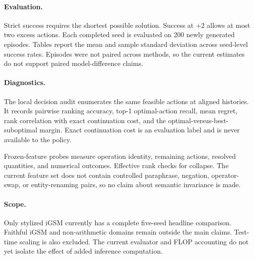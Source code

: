 \paragraph{Evaluation.}
Strict success requires the shortest possible solution. Success at $+2$ allows at most two excess actions. Each completed seed is evaluated on 200 newly generated episodes. Tables report the mean and sample standard deviation across seed-level success rates. Episodes were not paired across methods, so the current estimates do not support paired model-difference claims.

\paragraph{Diagnostics.}
The local decision audit enumerates the same feasible actions at aligned histories. It records pairwise ranking accuracy, top-1 optimal-action recall, mean regret, rank correlation with exact continuation cost, and the optimal-versus-best-suboptimal margin. Exact continuation cost is an evaluation label and is never available to the policy.

Frozen-feature probes measure operation identity, remaining actions, resolved quantities, and numerical outcomes. Effective rank checks for collapse. The current feature set does not contain controlled paraphrase, negation, operator-swap, or entity-renaming pairs, so no claim about semantic invariance is made.

\paragraph{Scope.}
Only stylized iGSM currently has a complete five-seed headline comparison. Faithful iGSM and non-arithmetic domains remain outside the main claims. Test-time scaling is also excluded. The current evaluator and FLOP accounting do not yet isolate the effect of added inference computation.
